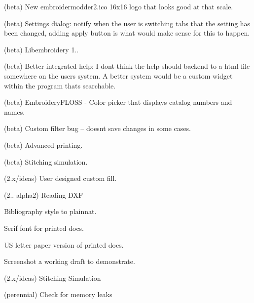 \begin{DoxyRefList}
\label{todo__todo000169}%
%
(beta) New embroidermodder2.\+ico 16x16 logo that looks good at that scale.

\label{todo__todo000170}%
%
(beta) Settings dialog\+: notify when the user is switching tabs that the setting has been changed, adding apply button is what would make sense for this to happen.

\label{todo__todo000171}%
%
(beta) Libembroidery 1..

\label{todo__todo000172}%
%
(beta) Better integrated help\+: I don\textquotesingle{}t think the help should backend to a html file somewhere on the user\textquotesingle{}s system. A better system would be a custom widget within the program that\textquotesingle{}s searchable.

\label{todo__todo000173}%
%
(beta) Embroidery\+FLOSS -\/ Color picker that displays catalog numbers and names.

\label{todo__todo000174}%
%
(beta) Custom filter bug -- doesn\textquotesingle{}t save changes in some cases.

\label{todo__todo000175}%
%
(beta) Advanced printing.

\label{todo__todo000176}%
%
(beta) Stitching simulation.

\label{todo__todo000177}%
%
(2.\+x/ideas) User designed custom fill.

\label{todo__todo000028}%
%
(2..-\/alpha2) Reading DXF

\label{todo__todo000015}%
%
Bibliography style to plainnat.

\label{todo__todo000016}%
%
Serif font for printed docs.

\label{todo__todo000017}%
%
US letter paper version of printed docs.

\label{todo__todo000018}%
%
Screenshot a working draft to demonstrate.

\label{todo__todo000109}%
%
(2.\+x/ideas) Stitching Simulation

\label{todo__todo000019}%
%
(perennial) Check for memory leaks 




\end{DoxyRefList}
